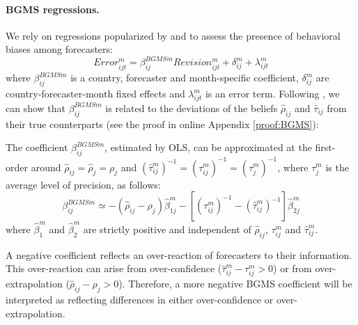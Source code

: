 
\paragraph{BGMS regressions.}

We rely on regressions popularized by \citet{Bordaloetal2020} and \citet{BroerKohlhas2019} to assess the presence of behavioral biases among forecasters:
\begin{equation}Error_{ijt}^m=\beta^{BGMSm}_{ij}Revision^m_{ijt}+\delta_{ij}^m+\lambda_{ijt}^m\label{eq:BGMS}
\end{equation}
where $\beta^{BGMSm}_{ij}$ is a country, forecaster and month-specific coefficient, $\delta_{ij}^m$ are country-forecaster-month fixed effects and $\lambda_{ijt}^m$ is an error term. Following \citet{Angeletosetal2020}, we can show that $\beta^{BGMSm}_{ij}$ is related to the deviations of the beliefs $\hat\rho_{ij}$ and $\hat\tau_{ij}$ from their true counterparts (see the proof in online Appendix \ref{proof:BGMS}):
\begin{prop}\label{prop:BGMS} The coefficient $\beta^{BGMSm}_{ij}$, estimated by OLS, can be approximated at the first-order around $\hat\rho_{ij}=\hat\rho_{j}=\rho_{j}$ and $(\hat\tau_{ij}^m)^{-1}=(\tau_{ij}^m)^{-1}=(\tau_j^m)^{-1}$, where $\tau_j^m$ is the average level of precision, as follows:
$$\beta^{BGMSm}_{ij}\simeq -(\hat\rho_{ij}-\rho_{j})\hat\beta_{1j}^m- [(\tau_{ij}^m)^{-1}-(\hat\tau_{ij}^m)^{-1}]\hat\beta_{2j}^m$$
where $\hat\beta_1^m$ and $\hat\beta_2^m$ are strictly positive and independent of $\hat\rho_{ij}$, $\tau_{ij}^m$ and $\hat\tau_{ij}^m$.
\end{prop}
A negative coefficient reflects an over-reaction of forecasters to their information. This over-reaction can arise from over-confidence ($\hat\tau_{ij}^m-\tau_{ij}^m>0$) or from over-extrapolation ($\hat\rho_{ij} -\rho_j>0$).
 Therefore, a more negative BGMS coefficient will be interpreted as reflecting differences in either over-confidence or over-extrapolation.

